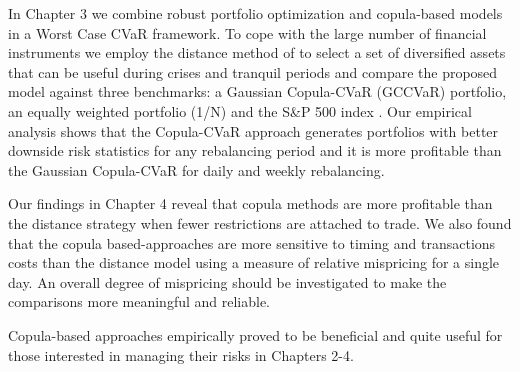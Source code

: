 \documentclass[a4paper,12pt]{report}
\begin{document}
In Chapter 3 we combine robust portfolio optimization and copula-based models in a Worst Case CVaR framework. To cope with the large number of financial instruments we employ the distance method of \citet*{ggr06} to select a set of diversified assets that can be useful during crises and tranquil periods and compare the proposed model against three benchmarks: a Gaussian Copula-CVaR (GCCVaR) portfolio, an equally weighted portfolio (1/N) and the S\&P 500 index . Our empirical analysis shows that the Copula-CVaR approach generates portfolios with better downside risk statistics for any rebalancing period and it is more profitable than the Gaussian Copula-CVaR for daily and weekly rebalancing.

Our findings in Chapter 4 reveal that copula methods are more profitable than the distance strategy when fewer restrictions are attached to trade. We also found that the copula based-approaches are more sensitive to timing and transactions costs than the distance model using a measure of relative mispricing for a single day. An overall degree of mispricing should be investigated to make the comparisons more meaningful and reliable.

Copula-based approaches empirically proved to be beneficial and quite useful for those interested in managing their risks in Chapters 2-4. 

%
%
\end{document}
